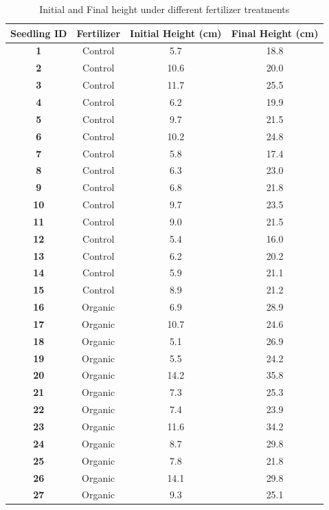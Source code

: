 \documentclass[
]{book}
\begin{document}
\begin{table}
\centering
\caption{\label{tab:ancova-data-tab}Initial and Final height under different fertilizer treatments}
\centering
\begin{tabular}[t]{>{}c|c|c|c}
\hline
Seedling ID & Fertilizer & Initial Height (cm) & Final Height (cm)\\
\hline
\textbf{1} & Control & 5.7 & 18.8\\
\hline
\textbf{2} & Control & 10.6 & 20.0\\
\hline
\textbf{3} & Control & 11.7 & 25.5\\
\hline
\textbf{4} & Control & 6.2 & 19.9\\
\hline
\textbf{5} & Control & 9.7 & 21.5\\
\hline
\textbf{6} & Control & 10.2 & 24.8\\
\hline
\textbf{7} & Control & 5.8 & 17.4\\
\hline
\textbf{8} & Control & 6.3 & 23.0\\
\hline
\textbf{9} & Control & 6.8 & 21.8\\
\hline
\textbf{10} & Control & 9.7 & 23.5\\
\hline
\textbf{11} & Control & 9.0 & 21.5\\
\hline
\textbf{12} & Control & 5.4 & 16.0\\
\hline
\textbf{13} & Control & 6.2 & 20.2\\
\hline
\textbf{14} & Control & 5.9 & 21.1\\
\hline
\textbf{15} & Control & 8.9 & 21.2\\
\hline
\textbf{16} & Organic & 6.9 & 28.9\\
\hline
\textbf{17} & Organic & 10.7 & 24.6\\
\hline
\textbf{18} & Organic & 5.1 & 26.9\\
\hline
\textbf{19} & Organic & 5.5 & 24.2\\
\hline
\textbf{20} & Organic & 14.2 & 35.8\\
\hline
\textbf{21} & Organic & 7.3 & 25.3\\
\hline
\textbf{22} & Organic & 7.4 & 23.9\\
\hline
\textbf{23} & Organic & 11.6 & 34.2\\
\hline
\textbf{24} & Organic & 8.7 & 29.8\\
\hline
\textbf{25} & Organic & 7.8 & 21.8\\
\hline
\textbf{26} & Organic & 14.1 & 29.8\\
\hline
\textbf{27} & Organic & 9.3 & 25.1\\

\end{tabular}
\end{table}
\end{document}
